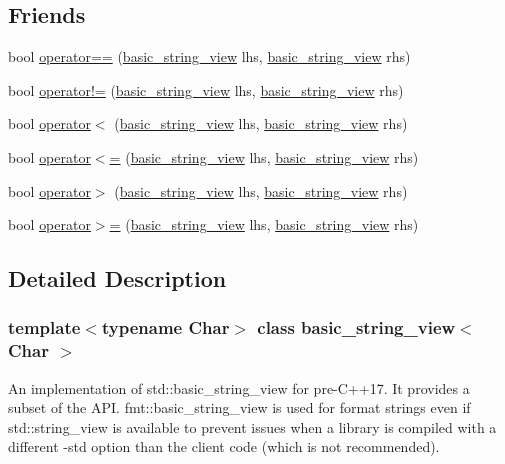 \subsection*{Friends}
\begin{DoxyCompactItemize}
\item 
bool \hyperlink{classbasic__string__view_abbcc283ebd35db4ae2d5365a0861a2e2}{operator==} (\hyperlink{classbasic__string__view}{basic\+\_\+string\+\_\+view} lhs, \hyperlink{classbasic__string__view}{basic\+\_\+string\+\_\+view} rhs)
\item 
bool \hyperlink{classbasic__string__view_a5ceb2a1bfa175c69d7bfda735e901d73}{operator!=} (\hyperlink{classbasic__string__view}{basic\+\_\+string\+\_\+view} lhs, \hyperlink{classbasic__string__view}{basic\+\_\+string\+\_\+view} rhs)
\item 
bool \hyperlink{classbasic__string__view_a0e53f2258bbcde6cc8426b0a0755029b}{operator$<$} (\hyperlink{classbasic__string__view}{basic\+\_\+string\+\_\+view} lhs, \hyperlink{classbasic__string__view}{basic\+\_\+string\+\_\+view} rhs)
\item 
bool \hyperlink{classbasic__string__view_a9b92d9c7a937c6945253fd8adfba7803}{operator$<$=} (\hyperlink{classbasic__string__view}{basic\+\_\+string\+\_\+view} lhs, \hyperlink{classbasic__string__view}{basic\+\_\+string\+\_\+view} rhs)
\item 
bool \hyperlink{classbasic__string__view_a78b8913fe704e33269d9baa6f310b9b8}{operator$>$} (\hyperlink{classbasic__string__view}{basic\+\_\+string\+\_\+view} lhs, \hyperlink{classbasic__string__view}{basic\+\_\+string\+\_\+view} rhs)
\item 
bool \hyperlink{classbasic__string__view_a13611d21d36e30193ebaf50463cbe75e}{operator$>$=} (\hyperlink{classbasic__string__view}{basic\+\_\+string\+\_\+view} lhs, \hyperlink{classbasic__string__view}{basic\+\_\+string\+\_\+view} rhs)
\end{DoxyCompactItemize}


\subsection{Detailed Description}
\subsubsection*{template$<$typename Char$>$\newline
class basic\+\_\+string\+\_\+view$<$ Char $>$}

An implementation of {\ttfamily std\+::basic\+\_\+string\+\_\+view} for pre-\/\+C++17. It provides a subset of the A\+PI. {\ttfamily fmt\+::basic\+\_\+string\+\_\+view} is used for format strings even if {\ttfamily std\+::string\+\_\+view} is available to prevent issues when a library is compiled with a different {\ttfamily -\/std} option than the client code (which is not recommended). 

